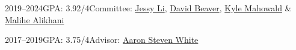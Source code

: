     {2019--2024}{\rmsc GPA: 3.92/4}{Committee: \href{https://jessyli.com}{Jessy Li}, \href{https://liberalarts.utexas.edu/linguistics/faculty/dib97}{David Beaver}, \href{}{Kyle Mahowald} \& \href{}{Malihe Alikhani}}

    {2017--2019}{\rmsc GPA: 3.75/4}{Advisor: \href{http://aaronstevenwhite.io}{Aaron Steven White}}

